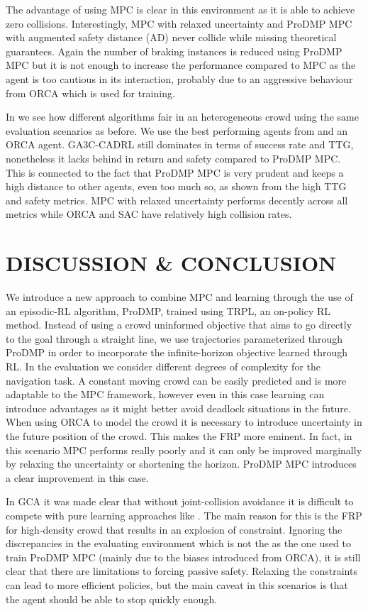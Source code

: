 \documentclass[letterpaper,conference,10pt]{IEEEconf}
\begin{document}
The advantage of using MPC is clear in this environment as it is able to achieve zero collisions. Interestingly, MPC with relaxed uncertainty and ProDMP MPC with augmented safety distance (AD) never collide while missing theoretical guarantees. Again the number of braking instances is reduced using ProDMP MPC but it is not enough to increase the performance compared to MPC as the agent is too cautious in its interaction, probably due to an aggressive behaviour from ORCA which is used for training.

In  we see how different algorithms fair in an heterogeneous crowd using the same evaluation scenarios as before. We use the best performing agents from  and an ORCA agent. GA3C-CADRL still dominates in terms of success rate and TTG, nonetheless it lacks behind in return and safety compared to ProDMP MPC. This is connected to the fact that ProDMP MPC is very prudent and keeps a high distance to other agents, even too much so, as shown from the high TTG and safety metrics. MPC with relaxed uncertainty performs decently across all metrics while ORCA and SAC have relatively high collision rates.

\section{DISCUSSION \& CONCLUSION}\label{sec:conclusion}
We introduce a new approach to combine MPC and learning through the use of an episodic-RL algorithm, ProDMP, trained using TRPL, an on-policy RL method. Instead of using a crowd uninformed objective that aims to go directly to the goal through a straight line, we use trajectories parameterized through ProDMP in order to incorporate the infinite-horizon objective learned through RL. In the evaluation we consider different degrees of complexity for the navigation task. A constant moving crowd can be easily predicted and is more adaptable to the MPC framework, however even in this case learning can introduce advantages as it might better avoid deadlock situations in the future. When using ORCA to model the crowd it is necessary to introduce uncertainty in the future position of the crowd. This makes the FRP more eminent. In fact, in this scenario MPC performs really poorly and it can only be improved marginally by relaxing the uncertainty or shortening the horizon. ProDMP MPC introduces a clear improvement in this case.

In GCA it was made clear that without joint-collision avoidance it is difficult to compete with pure learning approaches like \cite{everett_collision_2021}. The main reason for this is the FRP for high-density crowd that results in an explosion of constraint. Ignoring the discrepancies in the evaluating environment which is not the as the one used to train ProDMP MPC (mainly due to the biases introduced from ORCA), it is still clear that there are limitations to forcing passive safety. Relaxing the constraints can lead to more efficient policies, but the main caveat in this scenarios is that the agent should be able to stop quickly enough.
\end{document}
